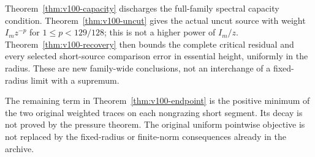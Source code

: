 \documentclass[11pt,reqno]{amsart}
\numberwithin{equation}{section}
\theoremstyle{definition}
\theoremstyle{remark}\newtheorem{remark}[theorem]{Remark}
\begin{document}
Theorem~\ref{thm:v100-capacity} discharges the full-family spectral
capacity condition. Theorem~\ref{thm:v100-uncut} gives the actual
uncut source with weight $I_mz^{-p}$ for $1\le p<129/128$; this is
not a higher power of $I_m/z$. Theorem~\ref{thm:v100-recovery} then
bounds the complete critical residual and every selected short-source
comparison error in essential height, uniformly in the radius.
These are new family-wide conclusions, not an interchange of a
fixed-radius limit with a supremum.

The remaining term in Theorem~\ref{thm:v100-endpoint} is the positive
minimum of the two original weighted traces on each nongrazing short
segment. Its decay is not proved by the pressure theorem. The original
uniform pointwise objective is not replaced by the fixed-radius or
finite-norm consequences already in the archive.















\appendix


\end{document}
